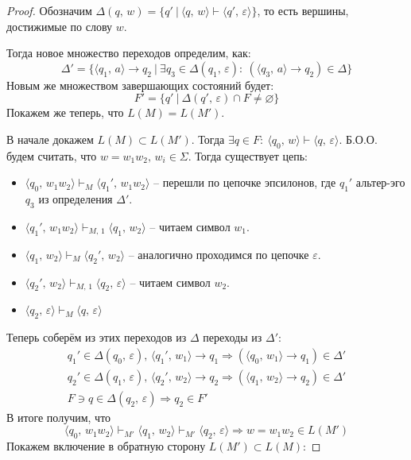 \documentclass[a4paper,12pt]{article}
\renewcommand{\emptyset}{\ensuremath{\varnothing}}
\theoremstyle{plain}
\theoremstyle{definition}
\theoremstyle{remark}
\begin{document}
\begin{proof}
	Обозначим $\Delta(q,\, w) = \{q' \:|\: \langle q,\, w\rangle \vdash \langle q',\, \varepsilon\rangle\}$, то есть вершины, достижимые по слову $w$.

	Тогда новое множество переходов определим, как:
	\[
		\Delta' = \{\langle q_1,\, a\rangle \to q_2 \:|\: \exists q_3 \in \Delta(q_1,\,\varepsilon) :\: (\langle q_3,\, a\rangle \to q_2) \in \Delta\}
	\]
	Новым же множеством завершающих состояний будет:
	\[
		F' = \{q' \:|\: \Delta(q',\, \varepsilon) \cap F \neq \emptyset\}
	\]
	Покажем же теперь, что $L(M) = L(M')$.

	В начале докажем $L(M) \subset L(M')$. Тогда $\exists q \in F :\: \langle q_0,\, w\rangle \vdash \langle q,\, \varepsilon\rangle$. Б.О.О. будем считать, что $w = w_1w_2,\, w_i \in \Sigma$. Тогда существует цепь:
	\begin{itemize}
		\item $\langle q_0,\, w_1w_2\rangle \vdash_M \langle q_1',\, w_1w_2\rangle$ -- перешли по цепочке эпсилонов, где $q_1'$ альтер-эго $q_3$ из определения $\Delta'$.
		\item $\langle q_1',\, w_1w_2\rangle \vdash_{M,\, 1} \langle q_1,\, w_2\rangle$ -- читаем символ $w_1$.
		\item $\langle q_1,\, w_2\rangle \vdash_M \langle q_2',\, w_2\rangle$ -- аналогично проходимся по цепочке $\varepsilon$.
		\item $\langle q_2',\, w_2\rangle \vdash_{M,\, 1} \langle q_2,\, \varepsilon\rangle$ -- читаем символ $w_2$.
		\item $\langle q_2,\, \varepsilon\rangle \vdash_M \langle q,\, \varepsilon\rangle$
	\end{itemize}
	Теперь соберём из этих переходов из $\Delta$ переходы из $\Delta'$:
	\begin{align*}
		q_1' \in \Delta(q_0,\, \varepsilon),\, \langle q_1',\, w_1\rangle \to q_1 \Rightarrow (\langle q_0,\, w_1\rangle \to q_1) \in \Delta' \\
		q_2' \in \Delta(q_1,\, \varepsilon),\, \langle q_2',\, w_2\rangle \to q_2 \Rightarrow (\langle q_1,\, w_2\rangle \to q_2) \in \Delta' \\
		F \ni q \in \Delta(q_2,\, \varepsilon) \Rightarrow q_2 \in F'
	\end{align*}
	В итоге получим, что
	\[
		\langle q_0,\, w_1w_2\rangle \vdash_{M'} \langle q_1,\, w_2\rangle \vdash_{M'} \langle q_2,\, \varepsilon\rangle \Rightarrow w = w_1w_2 \in L(M')
	\]
	Покажем включение в обратную сторону $L(M') \subset L(M)$:


\end{proof}
\end{document}
